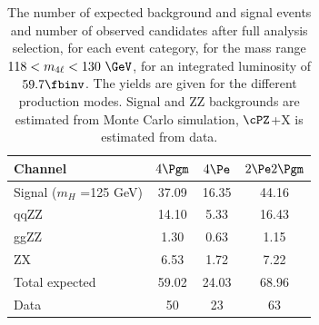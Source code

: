 \begin{table}[htb]
	\begin{center}
		\small
		\caption{The number of expected background and signal events and number of observed candidates after full analysis selection, for each event category, for the mass range $118<\mllll<130~\GeV$, for an integrated luminosity of $\usedLumiC$.
			The yields are given for the different production modes.
			Signal and ZZ backgrounds are estimated from Monte Carlo simulation, 
			$\cPZ$+X is estimated from data.
			\label{tab:EventYieldsPeak}}
		{
			\begin{tabular}{l|c|c|c}
				\hline
				\hline
				\textbf{Channel} & $4\Pgm$ & $4\Pe$ & $2\Pe2\Pgm$  \\
				\hline
				Signal ($m_{H}$ =125 GeV)  &37.09  &16.35  &44.16   \\
				 qqZZ     &14.10  &5.33   &16.43   \\
				 ggZZ     &1.30   &0.63   &1.15    \\
				 ZX       &6.53   &1.72   &7.22    \\
				 Total expected   &59.02 &24.03  &68.96   \\
				 Data     &50     &23     &63      \\
				\hline
				\hline
		\end{tabular}}
	\end{center}
\end{table}


